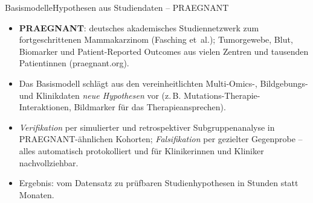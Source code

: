 \documentclass[final]{beamer}
\begin{document}
\begin{frame}[t]{Basismodelle}{Hypothesen aus Studiendaten -- PRAEGNANT}
\vspace{0.1em}
\begin{itemize}\itemsep=0.15em\small
  \item \textbf{PRAEGNANT}: deutsches akademisches Studiennetzwerk zum
        fortgeschrittenen Mammakarzinom (Fasching et~al.); Tumorgewebe,
        Blut, Biomarker und Patient-Reported Outcomes aus vielen
        Zentren und tausenden Patientinnen
        ({\ttfamily praegnant.org}).
\end{itemize}
\vspace{0.3em}
\begin{center}
\end{center}
\vspace{0.3em}
\begin{itemize}\itemsep=0.15em\small
  \item Das Basismodell schlägt aus den vereinheitlichten
        Multi-Omics-, Bildgebungs- und Klinikdaten \emph{neue
        Hypothesen} vor (z.\,B. Mutations-Therapie-Interaktionen,
        Bildmarker für das Therapieansprechen).
  \item \emph{Verifikation} per simulierter und retrospektiver
        Subgruppenanalyse in PRAEGNANT-ähnlichen Kohorten;
        \emph{Falsifikation} per gezielter Gegenprobe -- alles
        automatisch protokolliert und für Klinikerinnen und Kliniker
        nachvollziehbar.
  \item Ergebnis: vom Datensatz zu prüfbaren Studienhypothesen in
        Stunden statt Monaten.
\end{itemize}
\end{frame}
\end{document}
